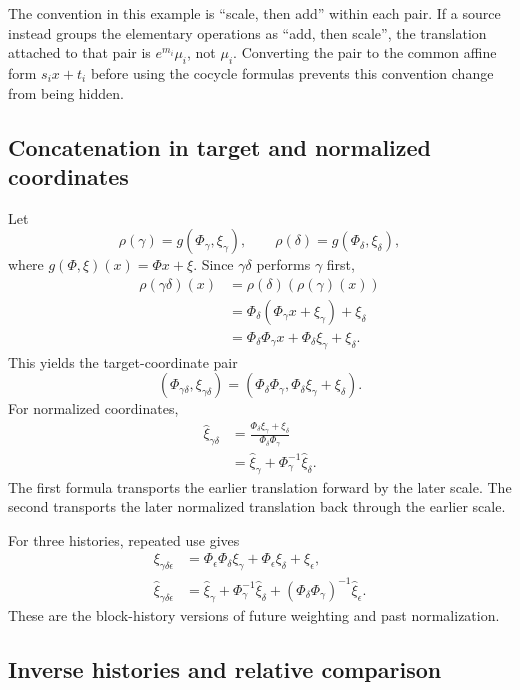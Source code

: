 The convention in this example is ``scale, then add'' within each pair.  If a
source instead groups the elementary operations as ``add, then scale'', the
translation attached to that pair is $e^{m_i}\mu_i$, not $\mu_i$.
Converting the pair to the common affine form $s_ix+t_i$ before using the
cocycle formulas prevents this convention change from being hidden.

\subsection{Concatenation in target and normalized coordinates}

Let
\[
  \rho(\gamma)=g(\Phi_\gamma,\xi_\gamma),
  \qquad
  \rho(\delta)=g(\Phi_\delta,\xi_\delta),
\]
where $g(\Phi,\xi)(x)=\Phi x+\xi$.  Since $\gamma\delta$ performs $\gamma$
first,
\begin{align*}
  \rho(\gamma\delta)(x)
  &=\rho(\delta)(\rho(\gamma)(x))\\
  &=\Phi_\delta(\Phi_\gamma x+\xi_\gamma)+\xi_\delta\\
  &=\Phi_\delta\Phi_\gamma x
    +\Phi_\delta\xi_\gamma+\xi_\delta.
\end{align*}
This yields the target-coordinate pair
\[
  (\Phi_{\gamma\delta},\xi_{\gamma\delta})
  =(\Phi_\delta\Phi_\gamma,
    \Phi_\delta\xi_\gamma+\xi_\delta).
\]
For normalized coordinates,
\begin{align*}
  \widehat\xi_{\gamma\delta}
  &=\frac{\Phi_\delta\xi_\gamma+\xi_\delta}
          {\Phi_\delta\Phi_\gamma}\\
  &=\widehat\xi_\gamma
    +\Phi_\gamma^{-1}\widehat\xi_\delta.
\end{align*}
The first formula transports the earlier translation forward by the later
scale.  The second transports the later normalized translation back through
the earlier scale.

For three histories, repeated use gives
\begin{align*}
  \xi_{\gamma\delta\epsilon}
  &=\Phi_\epsilon\Phi_\delta\xi_\gamma
    +\Phi_\epsilon\xi_\delta+\xi_\epsilon,\\
  \widehat\xi_{\gamma\delta\epsilon}
  &=\widehat\xi_\gamma
    +\Phi_\gamma^{-1}\widehat\xi_\delta
    +(\Phi_\delta\Phi_\gamma)^{-1}
      \widehat\xi_\epsilon.
\end{align*}
These are the block-history versions of future weighting and past
normalization.

\subsection{Inverse histories and relative comparison}

